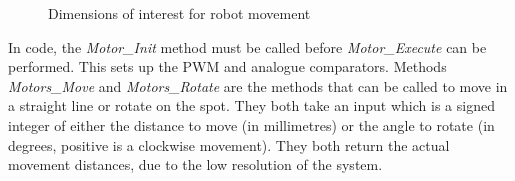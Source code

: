 \begin{figure}
\centering
{}
\caption{Dimensions of interest for robot movement}
\label{fig:RobotBase_Annotated}
\end{figure}

 

In code, the \textit{Motor\_Init} method must be called before \textit{Motor\_Execute} can be performed. This sets up the PWM and analogue comparators. Methods \textit{Motors\_Move} and \textit{Motors\_Rotate} are the methods that can be called to move in a straight line or rotate on the spot. They both take an input which is a signed integer of either the distance to move (in millimetres) or the angle to rotate (in degrees, positive is a clockwise movement). They both return the actual movement distances, due to the low resolution of the system.


